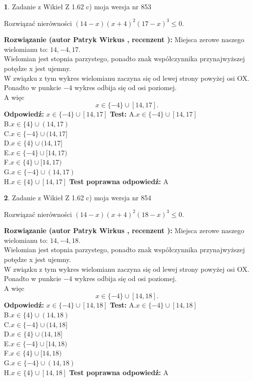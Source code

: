 \documentclass[12pt, a4paper]{article}
\theoremstyle{definition} %
\newtheorem{zad}{}
\newcommand{\zadStart}[1]{\begin{zad}#1\newline}
\newcommand{\zadStop}{\end{zad}}
\newcommand{\rozwStart}[2]{\noindent \textbf{Rozwiązanie (autor #1 , recenzent #2): }\newline}
\newcommand{\rozwStop}{\newline}
\newcommand{\odpStart}{\noindent \textbf{Odpowiedź:}\newline}
\newcommand{\odpStop}{\newline}
\newcommand{\testStart}{\noindent \textbf{Test:}\newline}
\newcommand{\testStop}{\newline}
\newcommand{\kluczStart}{\noindent \textbf{Test poprawna odpowiedź:}\newline}
\newcommand{\kluczStop}{\newline}
\begin{document}
\zadStart{Zadanie z Wikieł Z 1.62 c) moja wersja nr 853}

Rozwiązać nierówności $(14-x)(x+4)^{2}(17-x)^{3}\le0$.
\zadStop
\rozwStart{Patryk Wirkus}{}
Miejsca zerowe naszego wielomianu to: $14, -4, 17$.\\
Wielomian jest stopnia parzystego, ponadto znak współczynnika przy\linebreak najwyższej potędze x jest ujemny.\\ W związku z tym wykres wielomianu zaczyna się od lewej strony powyżej osi OX.\\
Ponadto w punkcie $-4$ wykres odbija się od osi poziomej.\\
A więc $$x \in \{-4\} \cup [14,17].$$
\rozwStop
\odpStart
$x \in \{-4\} \cup [14,17]$
\odpStop
\testStart
A.$x \in \{-4\} \cup [14,17]$\\
B.$x \in \{4\} \cup (14,17)$\\
C.$x \in \{-4\} \cup (14,17]$\\
D.$x \in \{4\} \cup (14,17]$\\
E.$x \in \{-4\} \cup [14,17)$\\
F.$x \in \{4\} \cup [14,17)$\\
G.$x \in \{-4\} \cup (14,17)$\\
H.$x \in \{4\} \cup [14,17]$
\testStop
\kluczStart
A
\kluczStop



\zadStart{Zadanie z Wikieł Z 1.62 c) moja wersja nr 854}

Rozwiązać nierówności $(14-x)(x+4)^{2}(18-x)^{3}\le0$.
\zadStop
\rozwStart{Patryk Wirkus}{}
Miejsca zerowe naszego wielomianu to: $14, -4, 18$.\\
Wielomian jest stopnia parzystego, ponadto znak współczynnika przy\linebreak najwyższej potędze x jest ujemny.\\ W związku z tym wykres wielomianu zaczyna się od lewej strony powyżej osi OX.\\
Ponadto w punkcie $-4$ wykres odbija się od osi poziomej.\\
A więc $$x \in \{-4\} \cup [14,18].$$
\rozwStop
\odpStart
$x \in \{-4\} \cup [14,18]$
\odpStop
\testStart
A.$x \in \{-4\} \cup [14,18]$\\
B.$x \in \{4\} \cup (14,18)$\\
C.$x \in \{-4\} \cup (14,18]$\\
D.$x \in \{4\} \cup (14,18]$\\
E.$x \in \{-4\} \cup [14,18)$\\
F.$x \in \{4\} \cup [14,18)$\\
G.$x \in \{-4\} \cup (14,18)$\\
H.$x \in \{4\} \cup [14,18]$
\testStop
\kluczStart
A
\kluczStop
\end{document}
